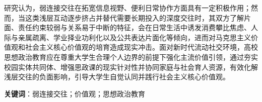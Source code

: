 \documentclass[master,public,library,win,HSS,reportbody,oneside,AutoFakeBold,biblatex]{def/buaa}
\begin{document}
研究认为，弱连接交往在拓宽信息视野、便利日常协作方面具有一定积极作用；然而，当这类浅层互动逐步挤占并替代需要长期投入的深度交往时，其双方了解片面、责任约束较弱与关系易于中断的特征，会在日常生活中诱发消费攀比焦虑、人际与亲属疏离、学业择业功利化以及公共表达片面化等倾向，进而对马克思主义价值观和社会主义核心价值观的培育造成现实冲击。面对新时代流动社交环境，高校思想政治教育应在尊重大学生合理个人边界的前提下强化主流价值引领，通过夯实校园实体共同体、增强思政课的现实针对性并协同家庭与社会育人资源，有效化解浅层交往的负面影响，引导大学生自觉认同并践行社会主义核心价值观。

{\heiti\bfseries 关键词}：弱连接交往；价值观；思想政治教育
\clearpage
{}
\makecontextlist
{}






\PrintReportBibliography
\end{document}
